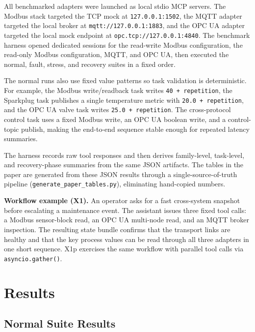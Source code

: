 \documentclass[conference]{IEEEtran}
\begin{document}
All benchmarked adapters were launched as local stdio MCP servers. The Modbus stack targeted the TCP mock at \texttt{127.0.0.1:1502}, the MQTT adapter targeted the local broker at \texttt{mqtt://127.0.0.1:1883}, and the OPC UA adapter targeted the local mock endpoint at \texttt{opc.tcp://127.0.0.1:4840}. The benchmark harness opened dedicated sessions for the read-write Modbus configuration, the read-only Modbus configuration, MQTT, and OPC UA, then executed the normal, fault, stress, and recovery suites in a fixed order.

The normal runs also use fixed value patterns so task validation is deterministic. For example, the Modbus write/readback task writes \texttt{40 + repetition}, the Sparkplug task publishes a single temperature metric with \texttt{20.0 + repetition}, and the OPC UA valve task writes \texttt{25.0 + repetition}. The cross-protocol control task uses a fixed Modbus write, an OPC UA boolean write, and a control-topic publish, making the end-to-end sequence stable enough for repeated latency summaries.

The harness records raw tool responses and then derives family-level, task-level, and recovery-phase summaries from the same JSON artifacts. The tables in the paper are generated from these JSON results through a single-source-of-truth pipeline (\texttt{generate\_paper\_tables.py}), eliminating hand-copied numbers.

\smallskip
\noindent\textbf{Workflow example (X1).} An operator asks for a fast cross-system snapshot before escalating a maintenance event. The assistant issues three fixed tool calls: a Modbus sensor-block read, an OPC UA multi-node read, and an MQTT broker inspection. The resulting state bundle confirms that the transport links are healthy and that the key process values can be read through all three adapters in one short sequence. X1p exercises the same workflow with parallel tool calls via \texttt{asyncio.gather()}.
\smallskip

\section{Results}
\label{sec:results}

\subsection{Normal Suite Results}
\label{sec:results:normal}

\begin{table}[t]
    \caption{Family-level results from the normal benchmark suite (30 repetitions). Cross-protocol rows aggregate the four multi-adapter tasks.}
    \label{tab:results}
    \centering
    \scriptsize
    \setlength{\tabcolsep}{3pt}
    
\end{table}
\end{document}
